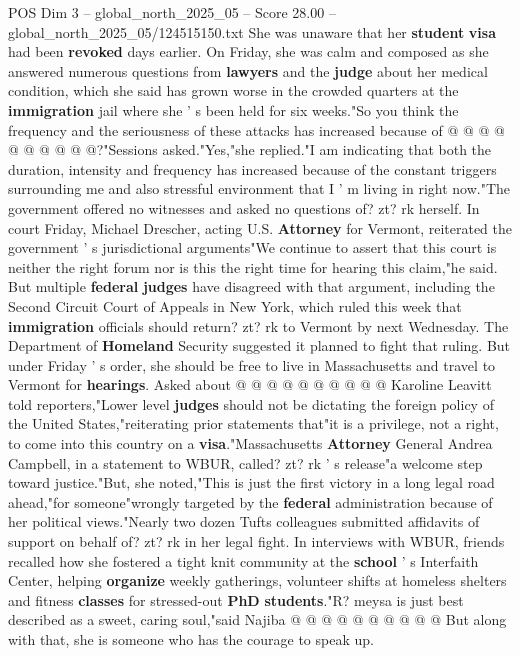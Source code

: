 \begin{textsample}{POS Dim 3 – global\_north\_2025\_05 – Score 28.00 – global\_north\_2025\_05/124515150.txt}
She was unaware that her \textbf{student} \textbf{visa} had been \textbf{revoked} days earlier.
On Friday, she was calm and composed as she answered numerous questions from \textbf{lawyers} and the \textbf{judge} about her medical condition, which she said has grown worse in the crowded quarters at the \textbf{immigration} jail where she ' s been held for six weeks."So you think the frequency and the seriousness of these attacks has increased because of @ @ @ @ @ @ @ @ @ @?"Sessions asked."Yes,"she replied."I am indicating that both the duration, intensity and frequency has increased because of the constant triggers surrounding me and also stressful environment that I ' m living in right now."The government offered no witnesses and asked no questions of? zt? rk herself.
In court Friday, Michael Drescher, acting U.S. \textbf{Attorney} for Vermont, reiterated the government ' s jurisdictional arguments"We continue to assert that this court is neither the right forum nor is this the right time for hearing this claim,"he said.
But multiple \textbf{federal} \textbf{judges} have disagreed with that argument, including the Second Circuit Court of Appeals in New York, which ruled this week that \textbf{immigration} officials should return? zt? rk to Vermont by next Wednesday.
The Department of \textbf{Homeland} Security suggested it planned to fight that ruling.
But under Friday ' s order, she should be free to live in Massachusetts and travel to Vermont for \textbf{hearings}.
Asked about @ @ @ @ @ @ @ @ @ @ Karoline Leavitt told reporters,"Lower level \textbf{judges} should not be dictating the foreign policy of the United States,"reiterating prior statements that"it is a privilege, not a right, to come into this country on a \textbf{visa}."Massachusetts \textbf{Attorney} General Andrea Campbell, in a statement to WBUR, called? zt? rk ' s release"a welcome step toward justice."But, she noted,"This is just the first victory in a long legal road ahead,"for someone"wrongly targeted by the \textbf{federal} administration because of her political views."Nearly two dozen Tufts colleagues submitted affidavits of support on behalf of? zt? rk in her legal fight.
In interviews with WBUR, friends recalled how she fostered a tight knit community at the \textbf{school} ' s Interfaith Center, helping \textbf{organize} weekly gatherings, volunteer shifts at homeless shelters and fitness \textbf{classes} for stressed-out \textbf{PhD} \textbf{students}."R? meysa is just best described as a sweet, caring soul,"said Najiba @ @ @ @ @ @ @ @ @ @ But along with that, she is someone who has the courage to speak up.

\end{textsample}
